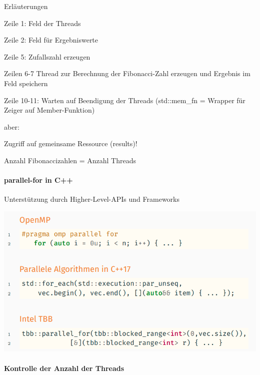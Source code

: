 \documentclass[10pt]{article}
\begin{document}
  Erläuterungen
  \begin{itemize*}
    \item Zeile 1: Feld der Threads
    \item Zeile 2: Feld für Ergebniswerte
    \item Zeile 5: Zufallszahl erzeugen
    \item Zeilen 6-7 Thread zur Berechnung der Fibonacci-Zahl erzeugen und Ergebnis im Feld speichern
    \item Zeile 10-11: Warten auf Beendigung der Threads (std::mem\_fn = Wrapper für Zeiger auf Member-Funktion)
    \item \color{orange} aber: \color{black}
    \begin{itemize*}
      \item Zugriff auf gemeinsame Ressource (results)!
      \item Anzahl Fibonaccizahlen = Anzahl Threads
    \end{itemize*}
  \end{itemize*}
  
  \paragraph{parallel-for in C++}
  
  \begin{itemize*}
    \item Unterstützung durch Higher-Level-APIs und Frameworks
  \end{itemize*}
  \begin{center}
    \includegraphics[width=0.4\linewidth]{Assets/Programmierparadigmen-code-snippet-19}
  \end{center}
  
  \paragraph{Kontrolle der Anzahl der Threads}
  
\end{document}
